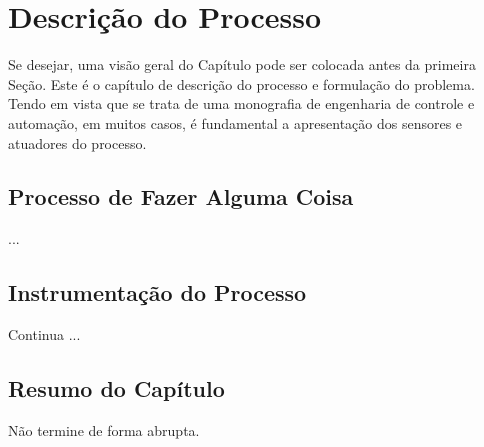 \chapter{Descrição do Processo}

Se desejar, uma visão geral do Capítulo pode ser colocada antes da primeira Seção. Este é o capítulo de descrição do processo e formulação do problema. Tendo em vista que se trata de uma monografia de engenharia de controle e automação, em muitos casos, é fundamental a apresentação dos sensores e atuadores do processo.


\section{Processo de Fazer Alguma Coisa}
\label{hist}

...


\section{Instrumentação do Processo}
\label{telefone}



Continua ...


\section{Resumo do Capítulo}

Não termine de forma abrupta.



\clearpage

